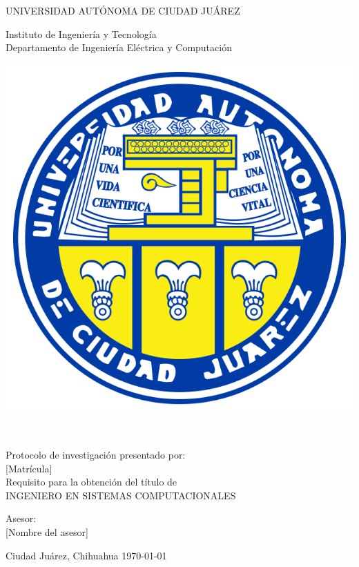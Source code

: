 \thispagestyle{empty}
\begin{center} \vfill
{\Large UNIVERSIDAD AUTÓNOMA DE CIUDAD JUÁREZ}\\
\vspace{6mm}
{\large Instituto de Ingeniería y Tecnología\\
\vspace{6mm}
Departamento de Ingeniería Eléctrica y Computación
\vspace{20mm}

\includegraphics [scale=0.7]{imagenes/escudo-uacj} 
\vspace{10mm}






\thetitle\\
\vspace{15mm}


Protocolo de investigación presentado por:\\
\vspace{6mm}
\theauthor\hspace{10mm} [Matrícula]\\
\vspace{10mm}
Requisito para la obtención del título de\\
\vspace{6mm}
INGENIERO EN SISTEMAS COMPUTACIONALES\\
\vspace{10mm}

Asesor:\\
{[Nombre del asesor]}\\
} \vfill
	Ciudad Juárez, Chihuahua \hspace{70mm}\today

\end{center} 